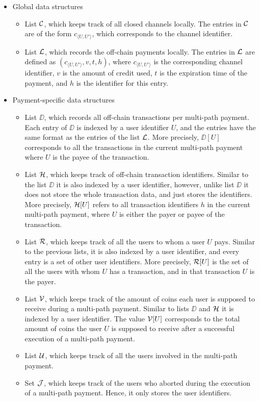 \begin{itemize}
	\item Global data structures
	\begin{itemize}
		\item List $\mathcal{C}$, which keeps track of all closed channels locally. The entries in $\mathcal{C}$ 
		are of the form $c_{\langle U,U' \rangle}$, which corresponds to the channel identifier.
		\item List $\mathcal{L}$, which records the off-chain payments locally. The entries in $\mathcal{L}$ are 
		defined as $(c_{\langle U,U' \rangle}, v, t, h)$, where $c_{\langle U,U' \rangle}$ is the 
		corresponding channel identifier, $v$ is the amount of credit used, $t$ is the expiration 
		time of the payment, and $h$ is the identifier for this entry.
	\end{itemize}
	
	\item Payment-specific data structures
	\begin{itemize}
		\item List $\DD$, which records all off-chain transactions per multi-path payment. Each 
		entry of $\DD$ is indexed by a user identifier $U$, and the entries have the same format 
		as the entries of the list $\mathcal{L}$. More precisely, $\DD[U]$ corresponds to all the 
		transactions in the current multi-path payment where $U$ is the payee of the transaction. 
		\item List $\mathcal{H}$, which keeps track of off-chain transaction identifiers. Similar to 
		the list $\DD$ it is also indexed by a user identifier, however, unlike list $\DD$ it 
		does not store the whole transaction data, and just stores the identifiers. More 
		precisely, $\mathcal{H}[U]$ refers to all transaction identifiers $h$ in the current multi-path 
		payment, where $U$ is either the payer or payee of the transaction.
		\item List $\mathcal{R}$, which keeps track of all the users to whom a user $U$ pays. Similar to 
		the previous lists, it is also indexed by a user identifier, and every entry is a set 
		of other user identifiers. More precisely, $\mathcal{R}[U]$ is the set of all the users with 
		whom $U$ has a transaction, and in that transaction $U$ is the payer.
		\item List $\mathcal{V}$, which keeps track of the amount of coins each user is supposed to 
		receive during a multi-path payment. Similar to lists $\DD$ and $\mathcal{H}$ it is indexed 
		by a user identifier. The value $\mathcal{V}[U]$ corresponds to the total amount of coins the 
		user $U$ is supposed to receive after a successful execution of a multi-path payment.
		\item List $\mathcal{U}$, which keeps track of all the users involved in the multi-path payment.
		\item Set $\mathcal{J}$, which keeps track of the users who aborted during the execution of 
		a multi-path payment. Hence, it only stores the user identifiers.
	\end{itemize}
\end{itemize}
	
